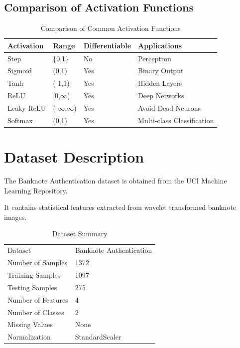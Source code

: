 \documentclass[12pt,a4paper]{article}
\begin{document}

\subsection{Comparison of Activation Functions}

\begin{table}[H]
\centering
\caption{Comparison of Common Activation Functions}
\begin{tabular}{llll}
\toprule
Activation & Range & Differentiable & Applications\\
\midrule
Step & \{0,1\} & No & Perceptron\\
Sigmoid & (0,1) & Yes & Binary Output\\
Tanh & (-1,1) & Yes & Hidden Layers\\
ReLU & [0,$\infty$) & Yes & Deep Networks\\
Leaky ReLU & (-$\infty$,$\infty$) & Yes & Avoid Dead Neurons\\
Softmax & (0,1) & Yes & Multi-class Classification\\
\bottomrule
\end{tabular}
\end{table}


\section{Dataset Description}

The Banknote Authentication dataset is obtained from the UCI Machine Learning Repository.

It contains statistical features extracted from wavelet transformed banknote images.

\begin{table}[H]
\centering
\caption{Dataset Summary}
\begin{tabular}{ll}
\toprule
Dataset & Banknote Authentication\\
Number of Samples & 1372\\
Training Samples & 1097\\
Testing Samples & 275\\
Number of Features & 4\\
Number of Classes & 2\\
Missing Values & None\\
Normalization & StandardScaler\\
\bottomrule
\end{tabular}
\end{table}
\end{document}
